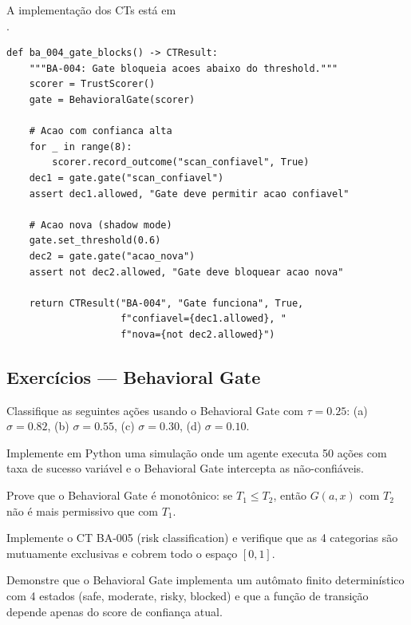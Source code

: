A implementação dos CTs está em \\%
\hspace*{2em}.

\begin{lstlisting}[style=pythonstyle, caption={CTs de validacao do Behavioral Gate (test\_behavioral\_autonomy.py)}]
def ba_004_gate_blocks() -> CTResult:
    """BA-004: Gate bloqueia acoes abaixo do threshold."""
    scorer = TrustScorer()
    gate = BehavioralGate(scorer)

    # Acao com confianca alta
    for _ in range(8):
        scorer.record_outcome("scan_confiavel", True)
    dec1 = gate.gate("scan_confiavel")
    assert dec1.allowed, "Gate deve permitir acao confiavel"

    # Acao nova (shadow mode)
    gate.set_threshold(0.6)
    dec2 = gate.gate("acao_nova")
    assert not dec2.allowed, "Gate deve bloquear acao nova"

    return CTResult("BA-004", "Gate funciona", True,
                    f"confiavel={dec1.allowed}, "
                    f"nova={not dec2.allowed}")
\end{lstlisting}

\subsection{Exercícios — Behavioral Gate}
\begin{exercicio}
Classifique as seguintes ações usando o Behavioral Gate com
$\tau = 0.25$: (a) $\sigma = 0.82$, (b) $\sigma = 0.55$,
(c) $\sigma = 0.30$, (d) $\sigma = 0.10$.
\end{exercicio}
\begin{exercicio}
Implemente em Python uma simulação onde um agente executa 50 ações
com taxa de sucesso variável e o Behavioral Gate intercepta as
não-confiáveis.
\end{exercicio}
\begin{exercicio}
Prove que o Behavioral Gate é monotônico: se $T_1 \leq T_2$, então
$G(a, x)$ com $T_2$ não é mais permissivo que com $T_1$.
\end{exercicio}
\begin{exercicio}
Implemente o CT BA-005 (risk classification) e verifique que as 4
categorias são mutuamente exclusivas e cobrem todo o espaço $[0,1]$.
\end{exercicio}
\begin{exercicio}
Demonstre que o Behavioral Gate implementa um autômato finito
determinístico com 4 estados (safe, moderate, risky, blocked) e que
a função de transição depende apenas do score de confiança atual.
\end{exercicio}

